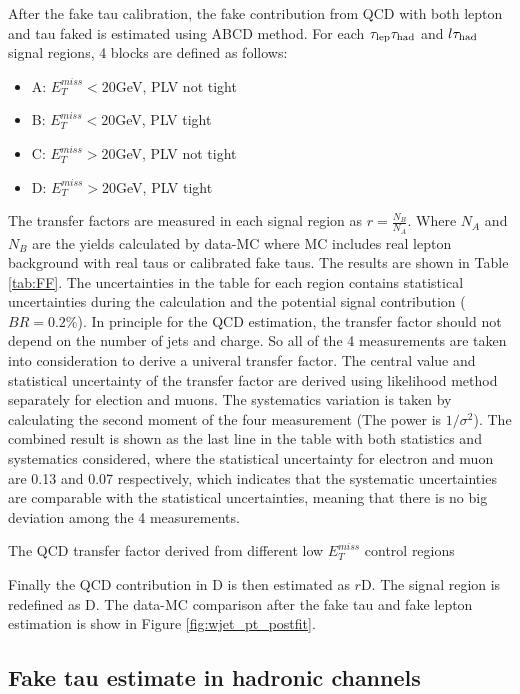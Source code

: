 After the fake tau calibration, the fake contribution from QCD with both lepton and tau faked is estimated using ABCD method. For each $\tau_\text{lep}{}\tau_\text{had}$ and $l\tau_\text{had}$ signal regions, 4 blocks are defined as follows:

\begin{itemize}
	\item A: $E_T^{miss}<20$GeV, PLV not tight
	\item B: $E_T^{miss}<20$GeV, PLV tight
	\item C: $E_T^{miss}>20$GeV, PLV not tight
	\item D: $E_T^{miss}>20$GeV, PLV tight
\end{itemize}
The transfer factors are measured in each signal region as $r=\frac{N_B}{N_A}$. Where $N_A$ and $N_B$ are the yields calculated by data-MC where MC includes real lepton background with real taus or calibrated fake taus. The results are shown in Table \ref{tab:FF}. The uncertainties in the table for each region contains statistical uncertainties during the calculation and the potential signal contribution ($BR=0.2\%$). In principle for the QCD estimation, the transfer factor should not depend on the number of jets and charge. So all of the 4 measurements are taken into consideration to derive a univeral transfer factor. The central value and statistical uncertainty of the transfer factor are derived using likelihood method separately for election and muons. The systematics variation is taken by calculating the second moment of the four measurement (The power is $1/\sigma^2$). The combined result is shown as the last line in the table with both statistics and systematics considered, where the statistical uncertainty for electron and muon are 0.13 and 0.07 respectively, which indicates that the systematic uncertainties are comparable with the statistical uncertainties, meaning that there is no big deviation among the 4 measurements.

\begin{table}
\caption{The QCD transfer factor derived from different low $E_T^{miss}$ control regions}
\label{tab:FF}

\end{table}

Finally the QCD contribution in D is then estimated as $r$D. The signal region is redefined as D.
The data-MC comparison after the fake tau and fake lepton estimation is show in Figure \ref{fig:wjet_pt_postfit}.


\subsection{Fake tau estimate in hadronic channels}
\label{sec:ss_method}

